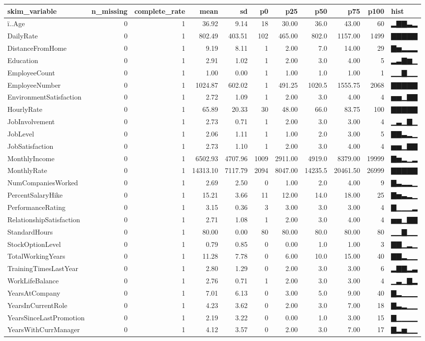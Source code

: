 \documentclass[
]{article}
\begin{document}
\begin{longtable}[]{@{}lrrrrrrrrrl@{}}
\toprule
skim\_variable & n\_missing & complete\_rate & mean & sd & p0 & p25 &
p50 & p75 & p100 & hist\tabularnewline
\midrule
\endhead
ï..Age & 0 & 1 & 36.92 & 9.14 & 18 & 30.00 & 36.0 & 43.00 & 60 &
▂▇▇▃▂\tabularnewline
DailyRate & 0 & 1 & 802.49 & 403.51 & 102 & 465.00 & 802.0 & 1157.00 &
1499 & ▇▇▇▇▇\tabularnewline
DistanceFromHome & 0 & 1 & 9.19 & 8.11 & 1 & 2.00 & 7.0 & 14.00 & 29 &
▇▅▂▂▂\tabularnewline
Education & 0 & 1 & 2.91 & 1.02 & 1 & 2.00 & 3.0 & 4.00 & 5 &
▂▃▇▆▁\tabularnewline
EmployeeCount & 0 & 1 & 1.00 & 0.00 & 1 & 1.00 & 1.0 & 1.00 & 1 &
▁▁▇▁▁\tabularnewline
EmployeeNumber & 0 & 1 & 1024.87 & 602.02 & 1 & 491.25 & 1020.5 &
1555.75 & 2068 & ▇▇▇▇▇\tabularnewline
EnvironmentSatisfaction & 0 & 1 & 2.72 & 1.09 & 1 & 2.00 & 3.0 & 4.00 &
4 & ▅▅▁▇▇\tabularnewline
HourlyRate & 0 & 1 & 65.89 & 20.33 & 30 & 48.00 & 66.0 & 83.75 & 100 &
▇▇▇▇▇\tabularnewline
JobInvolvement & 0 & 1 & 2.73 & 0.71 & 1 & 2.00 & 3.0 & 3.00 & 4 &
▁▃▁▇▁\tabularnewline
JobLevel & 0 & 1 & 2.06 & 1.11 & 1 & 1.00 & 2.0 & 3.00 & 5 &
▇▇▃▂▁\tabularnewline
JobSatisfaction & 0 & 1 & 2.73 & 1.10 & 1 & 2.00 & 3.0 & 4.00 & 4 &
▅▅▁▇▇\tabularnewline
MonthlyIncome & 0 & 1 & 6502.93 & 4707.96 & 1009 & 2911.00 & 4919.0 &
8379.00 & 19999 & ▇▅▂▁▂\tabularnewline
MonthlyRate & 0 & 1 & 14313.10 & 7117.79 & 2094 & 8047.00 & 14235.5 &
20461.50 & 26999 & ▇▇▇▇▇\tabularnewline
NumCompaniesWorked & 0 & 1 & 2.69 & 2.50 & 0 & 1.00 & 2.0 & 4.00 & 9 &
▇▃▂▂▁\tabularnewline
PercentSalaryHike & 0 & 1 & 15.21 & 3.66 & 11 & 12.00 & 14.0 & 18.00 &
25 & ▇▅▃▂▁\tabularnewline
PerformanceRating & 0 & 1 & 3.15 & 0.36 & 3 & 3.00 & 3.0 & 3.00 & 4 &
▇▁▁▁▂\tabularnewline
RelationshipSatisfaction & 0 & 1 & 2.71 & 1.08 & 1 & 2.00 & 3.0 & 4.00 &
4 & ▅▅▁▇▇\tabularnewline
StandardHours & 0 & 1 & 80.00 & 0.00 & 80 & 80.00 & 80.0 & 80.00 & 80 &
▁▁▇▁▁\tabularnewline
StockOptionLevel & 0 & 1 & 0.79 & 0.85 & 0 & 0.00 & 1.0 & 1.00 & 3 &
▇▇▁▂▁\tabularnewline
TotalWorkingYears & 0 & 1 & 11.28 & 7.78 & 0 & 6.00 & 10.0 & 15.00 & 40
& ▇▇▂▁▁\tabularnewline
TrainingTimesLastYear & 0 & 1 & 2.80 & 1.29 & 0 & 2.00 & 3.0 & 3.00 & 6
& ▂▇▇▂▃\tabularnewline
WorkLifeBalance & 0 & 1 & 2.76 & 0.71 & 1 & 2.00 & 3.0 & 3.00 & 4 &
▁▃▁▇▂\tabularnewline
YearsAtCompany & 0 & 1 & 7.01 & 6.13 & 0 & 3.00 & 5.0 & 9.00 & 40 &
▇▂▁▁▁\tabularnewline
YearsInCurrentRole & 0 & 1 & 4.23 & 3.62 & 0 & 2.00 & 3.0 & 7.00 & 18 &
▇▃▂▁▁\tabularnewline
YearsSinceLastPromotion & 0 & 1 & 2.19 & 3.22 & 0 & 0.00 & 1.0 & 3.00 &
15 & ▇▁▁▁▁\tabularnewline
YearsWithCurrManager & 0 & 1 & 4.12 & 3.57 & 0 & 2.00 & 3.0 & 7.00 & 17
& ▇▂▅▁▁\tabularnewline
\bottomrule
\end{longtable}
\end{document}
